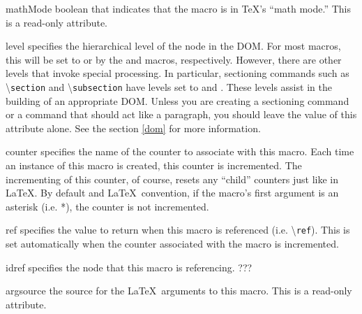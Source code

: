 \documentclass{manual}
\newcommand{\titleref}{\ref}
\newcommand{\macro}[1]{\textbackslash\texttt{#1}}
\begin{document}
\begin{memberdesc}[Macro]{mathMode}
boolean that indicates that the macro is in \TeX's ``math mode.''  This
is a read-only attribute.
\end{memberdesc}

\begin{memberdesc}[Macro]{level}
specifies the hierarchical level of the node in the DOM.  For most macros,
this will be set to  or 
 by the  and 
macros, respectively.  However, there are other levels that invoke special
processing.  In particular, sectioning commands such as \macro{section} and
\macro{subsection} have levels set to  and 
.  These levels assist in the building of 
an appropriate DOM.  Unless you are creating a sectioning command or a command
that should act like a paragraph, you should leave the value of this attribute
alone.  See the section \titleref{dom} for more information.
\end{memberdesc}

\begin{memberdesc}[Macro]{counter}
specifies the name of the counter to associate with this macro.  Each time
an instance of this macro is created, this counter is incremented.  
The incrementing of this counter, of course, resets any ``child'' counters
just like in \LaTeX.  By default and \LaTeX\ convention, if the macro's first 
argument is an asterisk (i.e. *), the counter is not incremented.
\end{memberdesc}

\begin{memberdesc}[Macro]{ref}
specifies the value to return when this macro is referenced (i.e. \macro{ref}).
This is set automatically when the counter associated with the macro is
incremented.
\end{memberdesc}

\begin{memberdesc}[Macro]{idref}
specifies the node that this macro is referencing.  ???
\end{memberdesc}

\begin{memberdesc}[Macro]{argsource}
the source for the \LaTeX\ arguments to this macro.  This is a read-only 
attribute.
\end{memberdesc}
\end{document}
